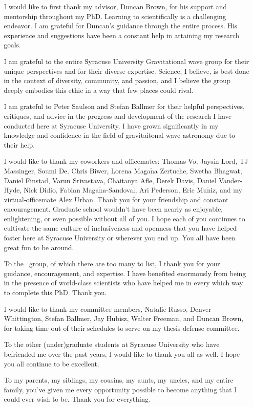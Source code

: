I would like to first thank my advisor, Duncan Brown, for his support and mentorship throughout my PhD. Learning
to scientifically is a challenging endeavor. I am grateful for Duncan's guidance through
the entire process. His experience and suggestions have been a constant help in attaining my research goals.

I am grateful to the entire Syracuse University Gravitational wave group for their unique perspectives and for their
diverse expertise. Science, I believe, is best done in the context of diversity, community, and passion, and I believe
the group deeply embodies this ethic in a way that few places could rival.

I am grateful to Peter Saulson and Stefan Ballmer for their helpful perspectives, critiques, and advice in the
progress and development of the research I have conducted here at Syracuse University. I
have grown significantly in my knowledge and confidence in the field of
gravitaitonal wave astronomy due to their help.

I would like to thank my coworkers and officemates: Thomas Vo, Jaysin Lord, TJ Massinger, Soumi De, Chris Biwer,
Lorena Maga$\tilde{\text{n}}$a Zertuche, Swetha Bhagwat, Daniel Finstad, Varun Srivastava,
Chaitanya Afle, Derek Davis, Daniel Vander-Hyde, Nick Didio,
Fabian Maga$\tilde{\text{n}}$a-Sandoval, Ari Pederson, Eric Mu$\tilde{\text{n}}$iz, and my virtual-officemate Alex Urban.
Thank you for your friendship and constant encouragement.
Graduate school wouldn't have been nearly as enjoyable, enlightening, or even possible without all of you.
I hope each of you continues to
cultivate the same culture of inclusiveness and openness that you have helped foster here at Syracuse University
or wherever you end up. You all have been great fun to be around.

To the \pycbc{}\ group, of which there are too many to list, I thank you for your guidance, encouragement, and
expertise. I have benefited enormously from being in the presence of world-class scientists who have helped
me in every which way to complete this PhD. Thank you. 

I would like to thank my committee members, Natalie Russo, Denver Whittington, Stefan Ballmer, Jay Hubisz, Walter Freeman, 
and Duncan Brown, for taking time out of their schedules to serve on my thesis defense committee.

To the other (under)graduate students at Syracuse University who have befriended me over the past years, I would
like to thank you all as well. I hope you all continue to be excellent. 

To my parents, my siblings, my cousins, my aunts, my uncles, and my entire family, you've given me every opportunity
possible to become anything that I could ever wish to be. Thank you for everything.
